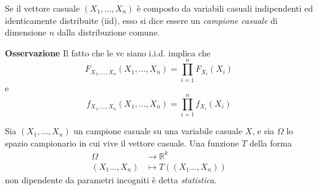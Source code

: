 \begin{dfn}
Se il vettore casuale \((X_1,\dotsc,X_n)\) è composto da variabili casuali indipendenti ed identicamente distribuite (iid), esso si dice essere un \emph{campione casuale} di dimensione \(n\) dalla distribuzione comune.
\end{dfn}

\noindent\textbf{Osservazione}
Il fatto che le vc siano i.i.d. implica che $$F_{X_1,...,X_n}(X_1,...,X_n)=\prod_{i=1}^n F_{X_i} (X_i)$$ e $$f_{X_1,...,X_n}(X_1,...,X_n)=\prod_{i=1}^n f_{X_i} (X_i)$$

\begin{dfn}[Statistica]
Sia \((X_1,\dotsc,X_n)\) un campione casuale su una variabile casuale \(X\), e sia \(\Omega\) lo spazio campionario in cui vive il vettore casuale. Una funzione \(T\) della forma
\begin{equation}
  \begin{split}
    \Omega &\to \mathbb{R}^k \\ (X_1\dotsc,X_n) &\mapsto T((X_1\dotsc,X_n)) 
  \end{split}
\end{equation}
non dipendente da parametri incogniti è detta \emph{statistica}.
\end{dfn}





